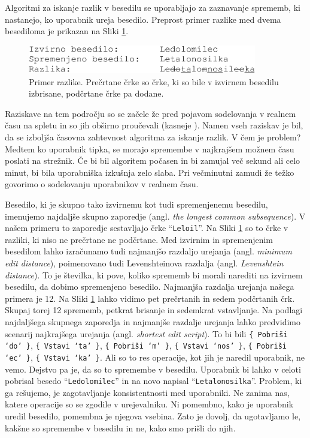 \documentclass[a4paper, 12pt, twoside]{book}
\begin{document}
Algoritmi za iskanje razlik v besedilu se uporabljajo za zaznavanje sprememb, ki nastanejo, ko uporabnik ureja besedilo. Preprost primer razlike med dvema besediloma je prikazan na Sliki \ref{diff}.

\begin{figure}[placement h]
\begin{center}
\includegraphics[width=10cm]{img/diff.pdf}
\end{center}
\caption{Primer razlike. Prečrtane črke so črke, ki so bile v izvirnem besedilu izbrisane, podčrtane črke pa dodane.}
\label{diff}
\end{figure}

Raziskave na tem področju so se začele že pred pojavom sodelovanja v realnem času na spletu in so jih obširno proučevali \cite{f-cmpr, o-nd, o-np} (kasneje \cite{diffstrg}). Namen vseh raziskav je bil, da se izboljša časovna zahtevnost algoritma za iskanje razlik. V čem je problem? Medtem ko uporabnik tipka, se morajo spremembe v najkrajšem možnem času poslati na strežnik. Če bi bil algoritem počasen in bi zamujal več sekund ali celo minut, bi bila uporabniška izkušnja zelo slaba. Pri večminutni zamudi že težko govorimo o sodelovanju uporabnikov v realnem času.

Besedilo, ki je skupno tako izvirnemu kot tudi spremenjenemu besedilu, imenujemo najdaljše skupno zaporedje (angl. \textit{the longest common subsequence}). V našem primeru to zaporedje sestavljajo črke “{\tt Leloil}”. Na Sliki \ref{diff} so to črke v razliki, ki niso ne prečrtane ne podčrtane. Med izvirnim in spremenjenim besedilom lahko izračunamo tudi najmanjšo razdaljo urejanja (angl. \textit{minimum edit distance}), poimenovano tudi Levenshteinova razdalja (angl. \textit{Levenshtein distance}). To je številka, ki pove, koliko sprememb bi morali narediti na izvirnem besedilu, da dobimo spremenjeno besedilo. Najmanjša razdalja urejanja našega primera je 12. Na Sliki \ref{diff} lahko vidimo pet prečrtanih in sedem podčrtanih črk. Skupaj torej 12 sprememb, petkrat brisanje in sedemkrat vstavljanje. Na podlagi najdaljšega skupnega zaporedja in najmanjše razdalje urejanja lahko predvidimo scenarij najkrajšega urejanja (angl. \textit{shortest edit script}). To bi bili {\tt \{ Pobriši ‘do’ \}}, {\tt \{ Vstavi ‘ta’ \}}, {\tt \{ Pobriši ‘m’ \}}, {\tt \{ Vstavi ‘nos’ \}}, {\tt \{ Pobriši ‘ec’ \}}, {\tt \{ Vstavi ‘ka’ \}}. Ali so to res operacije, kot jih je naredil uporabnik, ne vemo. Dejstvo pa je, da so to spremembe v besedilu. Uporabnik bi lahko v celoti pobrisal besedo “{\tt Ledolomilec}” in na novo napisal “{\tt Letalonosilka}”. Problem, ki ga rešujemo, je zagotavljanje konsistentnosti med uporabniki. Ne zanima nas, katere operacije so se zgodile v urejevalniku. Ni pomembno, kako je uporabnik uredil besedilo, pomembna je njegova vsebina. Zato je dovolj, da ugotavljamo le, kakšne so spremembe v besedilu in ne, kako smo prišli do njih.
\end{document}
